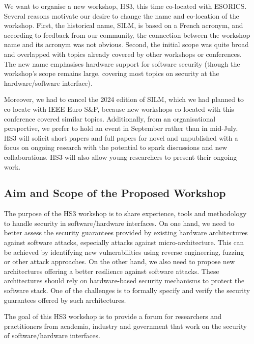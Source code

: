 \documentclass[a4paper,11pt]{article}
\newcommand{\SILMYear}{2025}
\begin{document}
We want to organise a new workshop, HS3, this time co-located with ESORICS. Several reasons motivate our desire to change the name and co-location of the workshop. First, the historical name, SILM, is based on a French acronym, and according to feedback from our community, the connection between the workshop name and its acronym was not obvious. Second, the initial scope was quite broad and overlapped with topics already covered by other workshops or conferences. The new name emphasises hardware support for software security (though the workshop’s scope remains large, covering most topics on security at the hardware/software interface).

Moreover, we had to cancel the 2024 edition of SILM, which we had planned to co-locate with IEEE Euro S\&P, because new workshops co-located with this conference covered similar topics. Additionally, from an organisational perspective, we prefer to hold an event in September rather than in mid-July.
HS3 will solicit short papers and full papers for novel and unpublished with a focus on ongoing research with the potential to spark
discussions and new collaborations. HS3 will also allow
young researchers to present their ongoing work.

\subsection{Aim and Scope of the Proposed Workshop}
%
The purpose of the HS3 workshop is to share experience, tools and
methodology to handle security in software/hardware interfaces. On one
hand, we need to better assess the security guarantees provided by existing
hardware architectures against software attacks, especially attacks against
micro-architecture. This can be achieved by identifying new vulnerabilities
using reverse engineering, fuzzing or other attack approaches. On the other
hand, we also need to propose new architectures offering a better
resilience against software attacks. These architectures should rely on
hardware-based security mechanisms to protect the software stack. One of
the challenges is to formally specify and verify the security guarantees
offered by such architectures.

The goal of this HS3 workshop is to provide a forum
for  researchers and practitioners from academia, industry and government
that work on the security of software/hardware interfaces.

\end{document}
